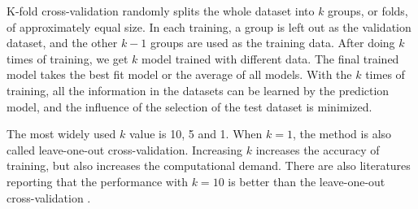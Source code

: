 K-fold cross-validation randomly splits the whole dataset into $k$ groups, or folds, of approximately equal size. In each training, a group is left out as the validation dataset, and the other $k-1$ groups are used as the training data. After doing $k$ times of training, we get $k$ model trained with different data. The final trained model takes the best fit model or the average of all models. With the $k$ times of training, all the information in the datasets can be learned by the prediction model, and the influence of the selection of the test dataset is minimized.

The most widely used $k$ value is 10, 5 and 1. When $k=1$, the method is also called leave-one-out cross-validation. Increasing $k$ increases the accuracy of training, but also increases the computational demand. There are also literatures reporting that the performance with $k=10$ is better than the leave-one-out cross-validation \cite{james2013introduction}.








